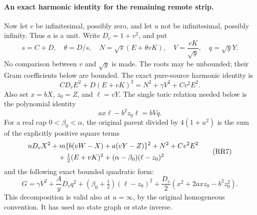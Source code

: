 \paragraph{An exact harmonic identity for the remaining remote strip.}
Now let $v$ be infinitesimal, possibly zero, and let $u$ not be
infinitesimal, possibly infinity.  Thus $a$ is a unit.
Write $D_v=1+v^2$, and put
\[
 s=C+D,\quad\theta=D/s,\quad
 N=\sqrt{s}(E+\theta vK),\quad
 V=\frac{vK}{\sqrt y},\quad q=\sqrt yY.
\]
No comparison between $v$ and $\sqrt y$ is made.  The roots may be
unbounded; their Gram coefficients below are bounded.  The exact
pure-source harmonic identity is
\[
 CD_vE^2+D(E+vK)^2=N^2+\gamma V^2+Cv^2E^2.               \tag{RR5}
\]
Also set $x=bX$, $z_0=Z$, and $\ell=vY$.  The single toric relation
needed below is the polynomial identity
\[
 a x\ell-b^2z_0\ell=bVq.                                \tag{RR6}
\]
For a real cap $0<\beta_0<\alpha$, the original parent divided
by $4(1+u^2)$ is the sum of the explicitly positive square terms
\[
 \begin{split}
 &nD_vX^2+m\{b(vW-X)+a(vY-Z)\}^2+N^2+Cv^2E^2\\
 &\hspace{15mm}+\tfrac12(E+vK)^2+(\alpha-\beta_0)(\ell-z_0)^2
 \end{split}                                             \tag{RR7}
\]
and the following exact bounded quadratic form:
\[
 G=\gamma V^2+\frac AyD_vq^2
 +(\beta_0+\tfrac12)(\ell-z_0)^2
 +\frac{D_v}{2}(x^2+2axz_0-b^2z_0^2).                   \tag{RR8}
\]
This decomposition is valid also at $u=\infty$, by the original
homogeneous convention.  It has used no state graph or state inverse.

